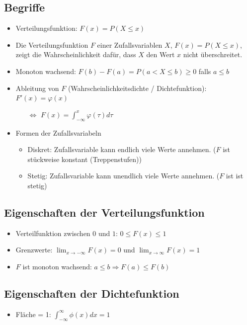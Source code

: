 \subsection{Begriffe}
\begin{itemize}
  \item Verteilungsfunktion: $F(x) = P(X \le x)$
  \item Die Verteilungsfunktion $F$ einer Zufallsvariablen $X$, $F(x) =
    P(X \leq x)$, zeigt die Wahrscheinlichkeit dafür, dass $X$ den Wert
    $x$ nicht überschreitet.
  \item Monoton wachsend: $F(b) - F(a) = P(a < X \leq b) \geq 0$ falls
    $a \leq b$
  \item Ableitung von $F$ (Wahrscheinlichkeitsdichte / Dichtefunktion):
    $F'(x) = \varphi(x)$
  \begin{itemize}
    \item[$\Leftrightarrow$] $F(x) = \int_{-\infty}^{x} \varphi(\tau) d\tau$
  \end{itemize}
  \item Formen der Zufallsvariabeln
  \begin{itemize}
    \item Diskret: Zufallsvariable kann endlich viele Werte annehmen.
      ($F$ ist stückweise konstant (Treppenstufen))
    \item Stetig: Zufallsvariable kann unendlich viele Werte annehmen.
      ($F$ ist ist stetig)
  \end{itemize}
\end{itemize}

\subsection{Eigenschaften der Verteilungsfunktion}
\begin{itemize}
  \item Verteilfunktion zwischen $0$ und $1$: $0 \le F(x) \le 1$
  \item Grenzwerte: $\lim_{x \to -\infty} F(x) = 0$ 
    und $\lim_{x \to \infty} F(x) = 1$
  \item $F$ ist monoton wachsend: $a \le b \Rightarrow F(a) \le F(b)$
\end{itemize}

\subsection{Eigenschaften der Dichtefunktion}
\begin{itemize}
  \item Fläche = 1: $\int_{-\infty}^{\infty} \phi(x) dx = 1$
\end{itemize}

